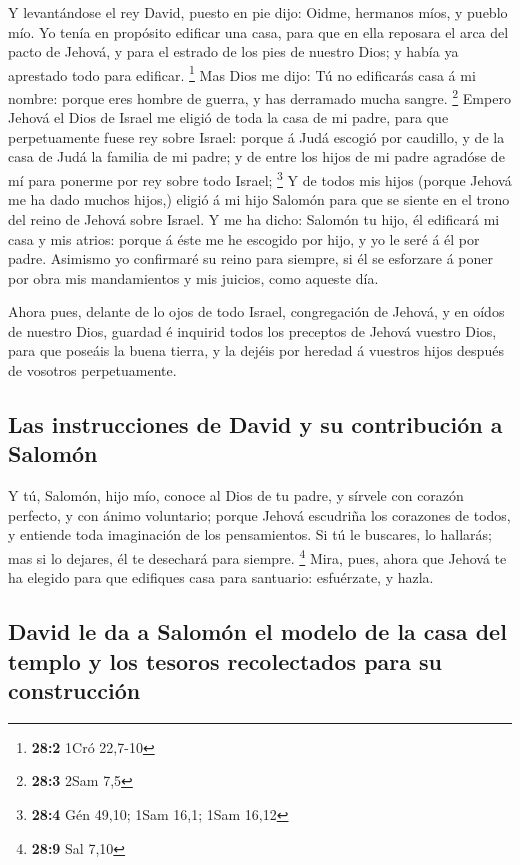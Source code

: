 Y levantándose el rey David, puesto en pie dijo: Oidme,
hermanos míos, y pueblo mío. Yo tenía en propósito edificar una casa,
para que en ella reposara el arca del pacto de Jehová, y para el estrado
de los pies de nuestro Dios; y había ya aprestado todo para edificar.
\footnote{\textbf{28:2} 1Cró 22,7-10}  Mas Dios me dijo:
Tú no edificarás casa á mi nombre: porque eres hombre de guerra, y has
derramado mucha sangre. \footnote{\textbf{28:3} 2Sam 7,5} 
Empero Jehová el Dios de Israel me eligió de toda la casa de mi padre,
para que perpetuamente fuese rey sobre Israel: porque á Judá escogió por
caudillo, y de la casa de Judá la familia de mi padre; y de entre los
hijos de mi padre agradóse de mí para ponerme por rey sobre todo Israel;
\footnote{\textbf{28:4} Gén 49,10; 1Sam 16,1; 1Sam 16,12} 
Y de todos mis hijos (porque Jehová me ha dado muchos hijos,) eligió á
mi hijo Salomón para que se siente en el trono del reino de Jehová sobre
Israel.  Y me ha dicho: Salomón tu hijo, él edificará mi
casa y mis atrios: porque á éste me he escogido por hijo, y yo le seré á
él por padre.  Asimismo yo confirmaré su reino para
siempre, si él se esforzare á poner por obra mis mandamientos y mis
juicios, como aqueste día.

 Ahora pues, delante de lo ojos de todo Israel,
congregación de Jehová, y en oídos de nuestro Dios, guardad é inquirid
todos los preceptos de Jehová vuestro Dios, para que poseáis la buena
tierra, y la dejéis por heredad á vuestros hijos después de vosotros
perpetuamente.

\hypertarget{las-instrucciones-de-david-y-su-contribuciuxf3n-a-salomuxf3n}{%
\subsection{Las instrucciones de David y su contribución a
Salomón}\label{las-instrucciones-de-david-y-su-contribuciuxf3n-a-salomuxf3n}}

 Y tú, Salomón, hijo mío, conoce al Dios de tu padre, y
sírvele con corazón perfecto, y con ánimo voluntario; porque Jehová
escudriña los corazones de todos, y entiende toda imaginación de los
pensamientos. Si tú le buscares, lo hallarás; mas si lo dejares, él te
desechará para siempre. \footnote{\textbf{28:9} Sal 7,10}
 Mira, pues, ahora que Jehová te ha elegido para que
edifiques casa para santuario: esfuérzate, y hazla.

\hypertarget{david-le-da-a-salomuxf3n-el-modelo-de-la-casa-del-templo-y-los-tesoros-recolectados-para-su-construcciuxf3n}{%
\subsection{David le da a Salomón el modelo de la casa del templo y los
tesoros recolectados para su
construcción}\label{david-le-da-a-salomuxf3n-el-modelo-de-la-casa-del-templo-y-los-tesoros-recolectados-para-su-construcciuxf3n}}

